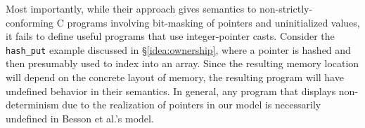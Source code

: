 Most importantly, while their approach gives semantics to non-strictly-conforming C programs involving bit-masking of pointers and
uninitialized values, it fails to define useful programs that use
integer-pointer casts.  Consider the \texttt{hash\_put} example
discussed in \S\ref{idea:ownership}, where a pointer is hashed and
then presumably used to index into an array.  Since the resulting
memory location will depend on the concrete layout of memory, the
resulting program will have undefined behavior in their semantics.  In
general, any program that displays non-determinism due to the
realization of pointers in our model is necessarily undefined in Besson et al.'s
model.






